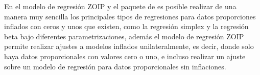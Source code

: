 En el modelo de regresi\'{o}n ZOIP y el paquete  de  es posible realizar de una ma\-ne\-ra muy sencilla los principales tipos de regresiones para datos proporciones inflados con ceros y unos que existen, como la regresi\'{o}n simplex y la regresi\'{o}n beta bajo diferentes parametrizaciones, adem\'{a}s el modelo de regresi\'{o}n ZOIP permite realizar ajustes a modelos inflados unilateralmente, es decir, donde solo haya datos proporcionales con valores cero o uno, e incluso realizar un ajuste sobre un modelo de regresi\'{o}n para datos proporcionales sin inflaciones.

